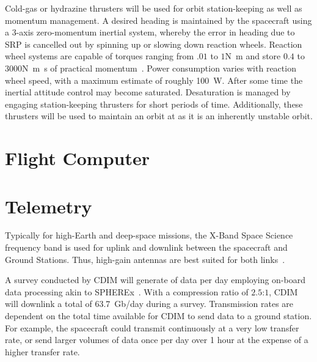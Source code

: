 \documentclass{ws-jai}
\begin{document}
Cold-gas or hydrazine thrusters will be used for orbit station-keeping as well as momentum management.
A desired heading is maintained by the spacecraft using a 3-axis zero-momentum inertial system, whereby the error in heading due to SRP is cancelled out by spinning up or slowing down reaction wheels.
Reaction wheel systems are capable of torques ranging from $.01$ to $1$\si{\newton\meter} and store $0.4$ to $3000$\si{\newton\meter\second} of practical momentum~\cite{smad2015}.
Power consumption varies with reaction wheel speed, with a maximum estimate of roughly \SI{100}{\watt}.
After some time the inertial attitude control may become saturated.
Desaturation is managed by engaging station-keeping thrusters for short periods of time.
Additionally, these thrusters will be used to maintain an orbit at \Ltwo{} as it is an inherently unstable orbit.

\section{Flight Computer}

\section{Telemetry}
\label{sec:telemetry}
Typically for high-Earth and deep-space missions, the X-Band Space Science frequency band is used for uplink and downlink between the spacecraft and Ground Stations.
Thus, high-gain antennas are best suited for both links~\cite{smad2015}.

A survey conducted by CDIM will generate  of data per day employing on-board data processing akin to SPHEREx~\cite{spherexTelemetry2016}.
With a compression ratio of $2.5$:$1$, CDIM will downlink a total of \SI{63.7}{Gb/day} during a survey.
Transmission rates are dependent on the total time available for CDIM to send data to a ground station.
For example, the spacecraft could transmit continuously at a very low transfer rate, or send larger volumes of data once per day over 1 hour at the expense of a higher transfer rate.
\end{document}

